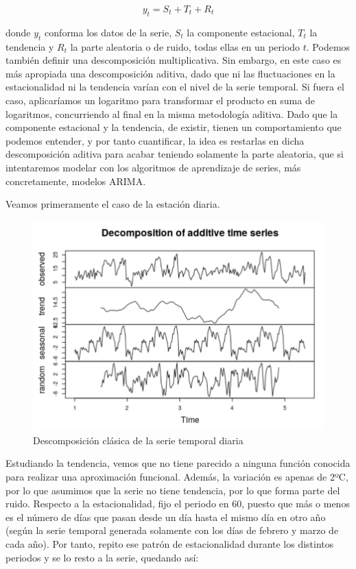 $$y_t =S_t + T_t + R_t$$

donde $y_t$ conforma los datos de la serie, $S_t$ la componente estacional, $T_t$ la tendencia y $R_t$ la parte aleatoria o de ruido, todas ellas en un periodo $t$. Podemos también definir una descomposición multiplicativa. Sin embargo, en este caso es más apropiada una descomposición aditiva, dado que ni las fluctuaciones en la estacionalidad ni la tendencia varían con el nivel de la serie temporal. Si fuera el caso, aplicaríamos un logaritmo para transformar el producto en suma de logaritmos, concurriendo al final en la misma metodología aditiva. Dado que la componente estacional y la tendencia, de existir, tienen un comportamiento que podemos entender, y por tanto cuantificar, la idea es restarlas en dicha descomposición aditiva para acabar teniendo solamente la parte aleatoria, que si intentaremos modelar con los algoritmos de aprendizaje de series, más concretamente, modelos ARIMA. 

Veamos primeramente el caso de la estación diaria. 

\begin{figure}[H] %
	\centering
	\includegraphics[scale=0.31]{decomp-diario.png}  %
	\caption{Descomposición clásica de la serie temporal diaria} 
	\label{fig:decomp-diaria}
\end{figure}

Estudiando la tendencia, vemos que no tiene parecido a ninguna función conocida para realizar una aproximación funcional. Además, la variación es apenas de 2ºC, por lo que asumimos que la serie no tiene tendencia, por lo que forma parte del ruido. Respecto a la estacionalidad, fijo el periodo en 60, puesto que más o menos es el número de días que pasan desde un día hasta el mismo día en otro año (según la serie temporal generada solamente con los días de febrero y marzo de cada año). Por tanto, repito ese patrón de estacionalidad durante los distintos periodos y se lo resto a la serie, quedando así:

